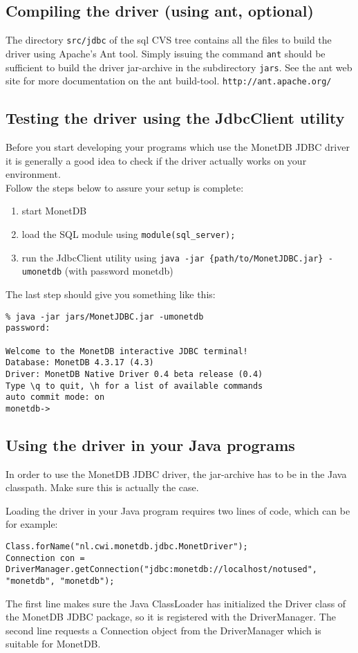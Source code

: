 \documentclass{article}
\begin{document}
\subsection{Compiling the driver (using ant, optional)}
The directory \texttt{src/jdbc} of the sql CVS tree contains all the files to build the driver using
Apache's Ant tool. Simply issuing the command \texttt{ant} should be sufficient to build the driver
jar-archive in the subdirectory \texttt{jars}. See the ant web site for more documentation on the
ant build-tool. \texttt{http://ant.apache.org/}

\subsection{Testing the driver using the JdbcClient utility}
Before you start developing your programs which use the MonetDB JDBC driver it is generally
a good idea to check if the driver actually works on your environment.\\
Follow the steps below to assure your setup is complete:
\begin{enumerate}
\item start MonetDB
\item load the SQL module using \texttt{module(sql\_server);}
\item run the JdbcClient utility using \texttt{java -jar \{path/to/MonetJDBC.jar\} -umonetdb} (with
 password monetdb)
\end{enumerate}
The last step should give you something like this:
\begin{verbatim}
% java -jar jars/MonetJDBC.jar -umonetdb
password:

Welcome to the MonetDB interactive JDBC terminal!
Database: MonetDB 4.3.17 (4.3)
Driver: MonetDB Native Driver 0.4 beta release (0.4)
Type \q to quit, \h for a list of available commands
auto commit mode: on
monetdb->
\end{verbatim}

\subsection{Using the driver in your Java programs}
In order to use the MonetDB JDBC driver, the jar-archive has to be in the Java classpath.
Make sure this is actually the case.

Loading the driver in your Java program requires two lines of code, which can be for example:
\begin{verbatim}
Class.forName("nl.cwi.monetdb.jdbc.MonetDriver");
Connection con = DriverManager.getConnection("jdbc:monetdb://localhost/notused", "monetdb", "monetdb");
\end{verbatim}
The first line makes sure the Java ClassLoader has initialized the Driver class of the MonetDB
JDBC package, so it is registered with the DriverManager. The second line requests a Connection
object from the DriverManager which is suitable for MonetDB.
\end{document}
